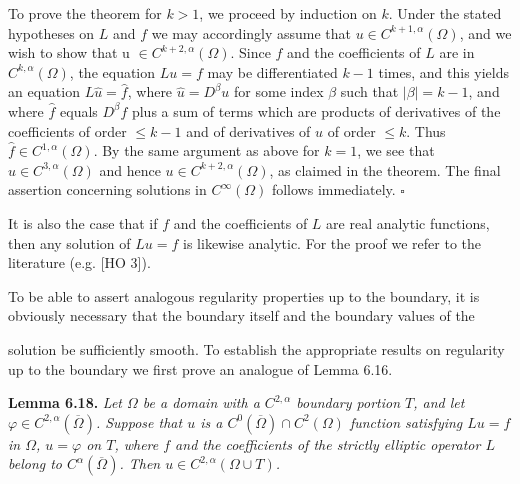 \begin{flushleft}
To prove the theorem for $k>1$, we proceed by induction on $k$. Under the stated hypotheses on $L$ and $f$ we may accordingly assume that $u\in C^{k+1,\alpha}(\Omega)$, and we wish to show that u $\in C^{k+2,\alpha}(\Omega)$. Since $f$ and the coefficients of $L$ are in $C^{k,\alpha}(\Omega)$, the equation $Lu=f$ may be differentiated $k-1$ times, and this yields an equation $L\hat{u}=\hat{f}$, where $\hat{u}=D^\beta u$ for some index $\beta$ such that $|\beta|=k-1$, and where $\hat{f}$ equals $D^\beta f$ plus a sum of terms which are products of derivatives of the coefficients of order $\leq k-1$ and of derivatives of $u$ of order $\leq k$. Thus $\hat{f}\in C^{1,\alpha}(\Omega)$. By the same argument as above for $k=1$, we see that $\hat{u}\in C^{3,\alpha}(\Omega)$ and hence $u\in C^{k+2,\alpha}(\Omega)$, as claimed in the theorem. The final assertion concerning solutions in $C^\infty(\Omega)$ follows immediately. $\square$
\end{flushleft}

\begin{flushleft}
It is also the case that if $f$ and the coefficients of $L$ are real analytic functions, then any solution of $Lu=f$ is likewise analytic. For the proof we refer to the literature (e.g. [HO 3]).
\end{flushleft}

\begin{flushleft}
To be able to assert analogous regularity properties up to the boundary, it is obviously necessary that the boundary itself and the boundary values of the
\end{flushleft}

\begin{flushleft}
solution be sufficiently smooth. To establish the appropriate results on regularity
up to the boundary we first prove an analogue of Lemma 6.16.
\end{flushleft}

\begin{flushleft}
\textbf{Lemma 6.18.} \emph{Let $\Omega$ be a domain with a $C^{2,\alpha}$ boundary portion $T$, and let $\varphi \in C^{2,\alpha}(\overline{\Omega})$.
Suppose that $u$ is a $C^0(\overline{\Omega}) \cap C^2(\Omega)$ function satisfying $Lu = f$ in $\Omega$, $u = \varphi$ on $T$,
where $f$ and the coefficients of the strictly elliptic operator $L$ belong to $C^\alpha(\overline{\Omega})$. Then
$u \in C^{2,\alpha}(\Omega \cup T)$.}
\end{flushleft}


